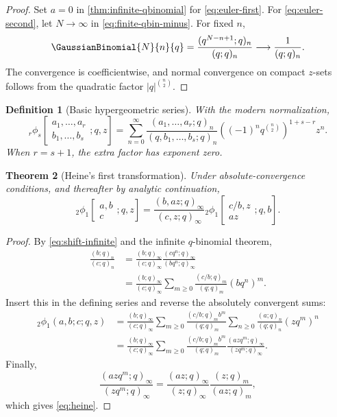 \documentclass[11pt]{article}
\theoremstyle{blueplain}
\newtheorem{theorem}{Theorem}[section]
\theoremstyle{bluedef}
\newtheorem{definition}[theorem]{Definition}
\begin{document}
\begin{proof}
Set $a=0$ in \cref{thm:infinite-qbinomial} for \eqref{eq:euler-first}. For \eqref{eq:euler-second}, let $N\to\infty$ in \eqref{eq:finite-qbin-minus}. For fixed $n$,
\[
\GaussianBinomial{N}{n}{q}=\frac{(q^{N-n+1};q)_n}{(q;q)_n}\longrightarrow\frac1{(q;q)_n}.
\]
The convergence is coefficientwise, and normal convergence on compact $z$-sets follows from the quadratic factor $|q|^{\binom n2}$.
\end{proof}

\begin{definition}[Basic hypergeometric series]
With the modern normalization,
\[
{}_r\phi_s\!\left[\begin{matrix}a_1,\ldots,a_r\\ b_1,\ldots,b_s\end{matrix};q,z\right]
=\sum_{n=0}^{\infty}
\frac{(a_1,\ldots,a_r;q)_n}{(q,b_1,\ldots,b_s;q)_n}
\left((-1)^nq^{\binom n2}\right)^{1+s-r}z^n.
\]
When $r=s+1$, the extra factor has exponent zero.
\end{definition}

\begin{theorem}[Heine's first transformation]\label{thm:heine}
Under absolute-convergence conditions, and thereafter by analytic continuation,
\begin{equation}\label{eq:heine}
{}_2\phi_1\!\left[\begin{matrix}a,b\\ c\end{matrix};q,z\right]
=\frac{(b,az;q)_\infty}{(c,z;q)_\infty}
{}_2\phi_1\!\left[\begin{matrix}c/b,z\\ az\end{matrix};q,b\right].
\end{equation}
\end{theorem}

\begin{proof}
By \eqref{eq:shift-infinite} and the infinite $q$-binomial theorem,
\begin{align*}
\frac{(b;q)_n}{(c;q)_n}
&=\frac{(b;q)_\infty}{(c;q)_\infty}\frac{(cq^n;q)_\infty}{(bq^n;q)_\infty}\\
&=\frac{(b;q)_\infty}{(c;q)_\infty}
  \sum_{m\ge0}\frac{(c/b;q)_m}{(q;q)_m}(bq^n)^m.
\end{align*}
Insert this in the defining series and reverse the absolutely convergent sums:
\begin{align*}
{}_2\phi_1(a,b;c;q,z)
&=\frac{(b;q)_\infty}{(c;q)_\infty}
\sum_{m\ge0}\frac{(c/b;q)_m b^m}{(q;q)_m}
\sum_{n\ge0}\frac{(a;q)_n}{(q;q)_n}(zq^m)^n\\
&=\frac{(b;q)_\infty}{(c;q)_\infty}
\sum_{m\ge0}\frac{(c/b;q)_m b^m}{(q;q)_m}
\frac{(azq^m;q)_\infty}{(zq^m;q)_\infty}.
\end{align*}
Finally,
\[
\frac{(azq^m;q)_\infty}{(zq^m;q)_\infty}
=\frac{(az;q)_\infty}{(z;q)_\infty}\frac{(z;q)_m}{(az;q)_m},
\]
which gives \eqref{eq:heine}.
\end{proof}
\end{document}
